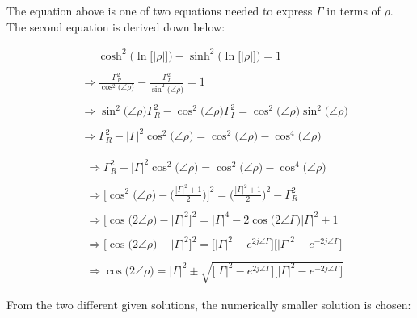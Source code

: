\documentclass{article}
\begin{document}
The equation above is one of two equations needed to express $\Gamma$ in terms of $\rho$. The second equation is derived down below:

\begin{align*}
    & \quad \ \ \cosh^{2}\Big(\ln\big[\big|\rho\big|\big]\Big) - \sinh^{2}\Big(\ln\big[\big|\rho\big|\big]\Big) = 1 \\ \\
    & \Rightarrow \frac{\Gamma_{R}^{2}}{\cos^{2}\big(\angle{\rho}\big)} - \frac{\Gamma_{I}^{2}}{\sin^{2}\big(\angle{\rho}\big)} = 1 \\ \\
    & \Rightarrow \sin^{2}\big(\angle{\rho}\big)\Gamma_{R}^{2} - \cos^{2}\big(\angle{\rho}\big)\Gamma_{I}^{2} = \cos^{2}\big(\angle{\rho}\big)\sin^{2}\big(\angle{\rho}\big) \\ \\
    & \Rightarrow \Gamma_{R}^{2} - \big|\Gamma\big|^{2}\cos^{2}\big(\angle{\rho}\big) = \cos^{2}\big(\angle{\rho}\big) - \cos^{4}\big(\angle{\rho}\big)
  \end{align*}

\newpage

\begin{align*}
    & \Rightarrow \Gamma_{R}^{2} - \big|\Gamma\big|^{2}\cos^{2}\big(\angle{\rho}\big) = \cos^{2}\big(\angle{\rho}\big) - \cos^{4}\big(\angle{\rho}\big) \\ \\
    & \Rightarrow \Bigg[\cos^{2}\big(\angle{\rho}\big) - \Bigg(\frac{\big|\Gamma\big|^{2} + 1}{2}\Bigg)\Bigg]^{2} = \Bigg(\frac{\big|\Gamma\big|^{2} + 1}{2}\Bigg)^{2} - \Gamma_{R}^{2} \\ \\ 
    & \Rightarrow \bigg[\cos\big(2\angle{\rho}\big) - \big|\Gamma\big|^{2}\bigg]^{2} = \big|\Gamma\big|^{4} - 2\cos\big(2\angle{\Gamma}\big)|\Gamma|^{2} + 1 \\ \\
    & \Rightarrow \bigg[\cos\big(2\angle{\rho}\big) - \big|\Gamma\big|^{2}\bigg]^{2} = \bigg[\big|\Gamma\big|^{2} - e^{2j\angle{\Gamma}}\bigg]\bigg[\big|\Gamma\big|^{2} - e^{-2j\angle{\Gamma}}\bigg] \\ \\
    & \Rightarrow \cos\big(2\angle{\rho}\big) = \big|\Gamma\big|^{2} \pm \sqrt{\bigg[\big|\Gamma\big|^{2} - e^{2j\angle{\Gamma}}\bigg]\bigg[\big|\Gamma\big|^{2} - e^{-2j\angle{\Gamma}}\bigg]}
  \end{align*}

From the two different given solutions, the numerically smaller solution is chosen:
\end{document}

